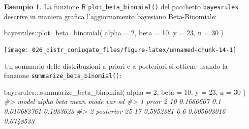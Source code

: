 \documentclass[
  11pt,
  italian,
  a4paper,
  extrafontsizes,onecolumn,openright
  ]{memoir}
\newenvironment{Shaded}{\begin{snugshade}}{\end{snugshade}}
\newcommand{\AttributeTok}[1]{\textcolor[rgb]{0.77,0.63,0.00}{#1}}
\newcommand{\CommentTok}[1]{\textcolor[rgb]{0.56,0.35,0.01}{\textit{#1}}}
\newcommand{\DecValTok}[1]{\textcolor[rgb]{0.00,0.00,0.81}{#1}}
\newcommand{\FunctionTok}[1]{\textcolor[rgb]{0.00,0.00,0.00}{#1}}
\newcommand{\NormalTok}[1]{#1}
\newcommand{\SpecialCharTok}[1]{\textcolor[rgb]{0.00,0.00,0.00}{#1}}
\newcommand{\R}{\textsf{R}} %
\theoremstyle{definition}
\theoremstyle{definition}
\newtheorem{example}{Esempio}[chapter]
\theoremstyle{definition}
\theoremstyle{definition}
\theoremstyle{remark}
\begin{document}
\begin{example}

La funzione \(\R\) \texttt{plot\_beta\_binomial()} del pacchetto \texttt{bayesrules} descrive in maniera grafica l'aggiornamento bayesiano Beta-Binomiale:

\begin{Shaded}
\begin{Highlighting}[]
\NormalTok{bayesrules}\SpecialCharTok{::}\FunctionTok{plot\_beta\_binomial}\NormalTok{(}
  \AttributeTok{alpha =} \DecValTok{2}\NormalTok{, }\AttributeTok{beta =} \DecValTok{10}\NormalTok{, }\AttributeTok{y =} \DecValTok{23}\NormalTok{, }\AttributeTok{n =} \DecValTok{30}
\NormalTok{)}
\end{Highlighting}
\end{Shaded}

\begin{center}\texttt{[image: 026\_distr\_coniugate\_files/figure-latex/unnamed-chunk-14-1]} \end{center}

Un sommario delle distribuzioni a priori e a posteriori si ottiene usando la funzione \texttt{summarize\_beta\_binomial()}:

\begin{Shaded}
\begin{Highlighting}[]
\NormalTok{bayesrules}\SpecialCharTok{:::}\FunctionTok{summarize\_beta\_binomial}\NormalTok{(}
  \AttributeTok{alpha =} \DecValTok{2}\NormalTok{, }\AttributeTok{beta =} \DecValTok{10}\NormalTok{, }\AttributeTok{y =} \DecValTok{23}\NormalTok{, }\AttributeTok{n =} \DecValTok{30}
\NormalTok{)}
\CommentTok{\#\textgreater{}       model alpha beta      mean mode         var        sd}
\CommentTok{\#\textgreater{} 1     prior     2   10 0.1666667  0.1 0.010683761 0.1033623}
\CommentTok{\#\textgreater{} 2 posterior    25   17 0.5952381  0.6 0.005603016 0.0748533}
\end{Highlighting}
\end{Shaded}

\end{example}
\end{document}
